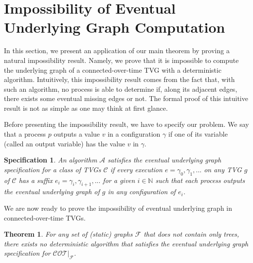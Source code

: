 \documentclass[11pt]{article}
\newtheorem{theorem}{Theorem}
\newtheorem{specification}{Specification}
\begin{document}
\section{Impossibility of Eventual Underlying Graph Computation \label{sec:COT}}

In this section, we present an application of our main theorem by proving a natural impossibility result. Namely, we prove that it is impossible to compute the underlying graph of a connected-over-time TVG with a deterministic algorithm. Intuitively, this impossibility result comes from the fact that, with such an algorithm, no process is able to determine if, along its adjacent edges, there exists some eventual missing edges or not. The formal proof of this intuitive result is not as simple as one may think at first glance. 

Before presenting the impossibility result, we have to specify our problem. We say that a process $p$ outputs a value $v$ in a configuration $\gamma$ if one of its variable (called an output variable) has the value $v$ in $\gamma$.

\begin{specification}
An algorithm $\mathcal{A}$ satisfies the eventual underlying graph specification for a class of TVGs $\mathcal{C}$ if every execution $e=\gamma_0,\gamma_1,...$ on any TVG $g$ of $\mathcal{C}$ has a suffix $e_i=\gamma_i,\gamma_{i+1},...$ for a given $i\in\mathbb{N}$ such that each process outputs the eventual underlying graph of $g$ in any configuration of $e_i$.
\end{specification} 

We are now ready to prove the impossibility of eventual underlying graph in connected-over-time TVGs.

\begin{theorem}\label{th:COTCOT}
For any set of (static) graphs $\mathcal{F}$ that does not contain only trees, there exists no deterministic algorithm that satisfies the eventual underlying graph specification for $\mathcal{COT}|_\mathcal{F}$.
\end{theorem}
\end{document}
